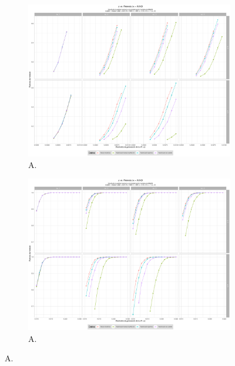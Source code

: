 \documentclass[IB,BIB]{TFUOC}%
\begin{document}
\begin{figure}[!htbp]
\hspace*{-2cm} %
\begin{subfigure}{.65\textwidth}
  \centering
  \includegraphics[width=.7\linewidth]{OBJ2SimplexMANTAqloc001ColaIzq.pdf}
  \caption{\scriptsize{A.}}
  \label{figAppend:OBJ2SimplexMANTAqloc001ColaIzq}
\end{subfigure}%
\begin{subfigure}{.65\textwidth}
\hspace*{-2.3cm} %
  \centering
  \includegraphics[width=.7\linewidth]{OBJ2SimplexMANTAqloc001Coladch.pdf}
  \caption{\scriptsize{A.}}
  \label{figAppend:OBJ2SimplexMANTAqloc001Coladch}
\end{subfigure}
\caption{\scriptsize{A.}}
\label{figAppend:OBJ2001zoom}
\end{figure}
\end{document}
